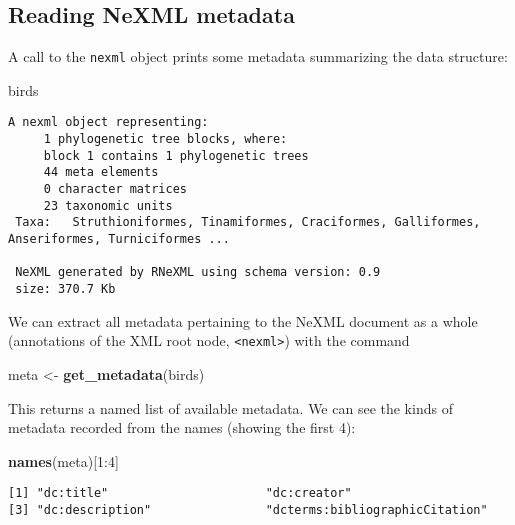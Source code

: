 \documentclass[author-year, review, 11pt]{components/elsarticle} %
\newenvironment{Shaded}{\begin{snugshade}}{\end{snugshade}}
\newcommand{\KeywordTok}[1]{\textcolor[rgb]{0.13,0.29,0.53}{\textbf{{#1}}}}
\newcommand{\DecValTok}[1]{\textcolor[rgb]{0.00,0.00,0.81}{{#1}}}
\newcommand{\StringTok}[1]{\textcolor[rgb]{0.31,0.60,0.02}{{#1}}}
\newcommand{\NormalTok}[1]{{#1}}
\begin{document}
\subsection{Reading NeXML metadata}\label{reading-nexml-metadata}

A call to the \texttt{nexml} object prints some metadata summarizing the
data structure:

\begin{Shaded}
\begin{Highlighting}[]
\NormalTok{birds}
\end{Highlighting}
\end{Shaded}

\begin{verbatim}
A nexml object representing:
     1 phylogenetic tree blocks, where: 
     block 1 contains 1 phylogenetic trees 
     44 meta elements 
     0 character matrices 
     23 taxonomic units 
 Taxa:   Struthioniformes, Tinamiformes, Craciformes, Galliformes, Anseriformes, Turniciformes ... 

 NeXML generated by RNeXML using schema version: 0.9 
 size: 370.7 Kb 
\end{verbatim}

We can extract all metadata pertaining to the NeXML document as a whole
(annotations of the XML root node,
\texttt{\textless{}nexml\textgreater{}}) with the command

\begin{Shaded}
\begin{Highlighting}[]
\NormalTok{meta <-}\StringTok{ }\KeywordTok{get_metadata}\NormalTok{(birds) }
\end{Highlighting}
\end{Shaded}

This returns a named list of available metadata. We can see the kinds of
metadata recorded from the names (showing the first 4):

\begin{Shaded}
\begin{Highlighting}[]
\KeywordTok{names}\NormalTok{(meta)[}\DecValTok{1}\NormalTok{:}\DecValTok{4}\NormalTok{]}
\end{Highlighting}
\end{Shaded}

\begin{verbatim}
[1] "dc:title"                      "dc:creator"                   
[3] "dc:description"                "dcterms:bibliographicCitation"
\end{verbatim}
\end{document}
